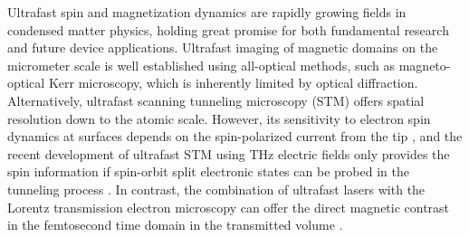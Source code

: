 \documentclass[prl,twocolumn,floatfix,superscriptaddress,aps]{revtex4-2}
\begin{document}
\maketitle
Ultrafast spin and magnetization dynamics are rapidly growing fields in condensed matter physics, holding great promise for both fundamental research and future device applications. Ultrafast imaging of magnetic domains on the micrometer scale is well established using all-optical methods, such as magneto-optical Kerr microscopy, which is inherently limited by optical diffraction. 
Alternatively, ultrafast scanning tunneling microscopy (STM) offers spatial resolution down to the atomic scale. However, its sensitivity to electron spin dynamics at surfaces depends on the spin-polarized current from the tip \cite{yoshida14}, and the recent development of ultrafast STM using THz electric fields \cite{mueller24} only provides the spin information if spin-orbit split electronic states can be probed in the tunneling process \cite{roelcke24}. In contrast, the combination of ultrafast lasers with the Lorentz transmission electron microscopy can offer the direct magnetic contrast in the femtosecond time domain in the transmitted volume \cite{daSilva18, moeller20, tengdin20}.
\end{document}
